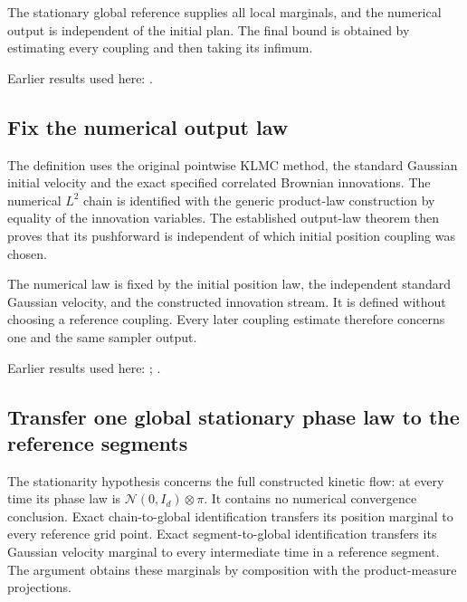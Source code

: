 \documentclass[11pt,a4paper]{report}
\begin{document}
The stationary global reference supplies all local marginals, and the numerical output is independent of the initial plan. The final bound is obtained by estimating every coupling and then taking its infimum.



Earlier results used here: \cite[Section~3.18]{LangevinLean2026ULASC}.
\subsection{\texorpdfstring{Fix the numerical output law}{Fix the numerical output law}}
\label{report-step-KineticLangevin-CanonicalKLMCBound-lean-1}


The definition uses the original pointwise KLMC method, the standard Gaussian initial velocity and the exact specified correlated Brownian innovations. The numerical \(L^{2}\) chain is identified with the generic product-law construction by equality of the innovation variables. The established output-law theorem then proves that its pushforward is independent of which initial position coupling was chosen.



The numerical law is fixed by the initial position law, the independent standard Gaussian velocity, and the constructed innovation stream. It is defined without choosing a reference coupling. Every later coupling estimate therefore concerns one and the same sampler output.



Earlier results used here: \cite[Section~3.17.1]{LangevinLean2026ULASC}; \cite[Section~3.17.2]{LangevinLean2026ULASC}.
\subsection{\texorpdfstring{Transfer one global stationary phase law to the reference segments}{Transfer one global stationary phase law to the reference segments}}
\label{report-step-KineticLangevin-CanonicalKLMCBound-lean-2}


The stationarity hypothesis concerns the full constructed kinetic flow: at every time its phase law is \(\mathcal N(0,I_d)\otimes\pi\). It contains no numerical convergence conclusion. Exact chain-to-global identification transfers its position marginal to every reference grid point. Exact segment-to-global identification transfers its Gaussian velocity marginal to every intermediate time in a reference segment. The argument obtains these marginals by composition with the product-measure projections.
\end{document}
